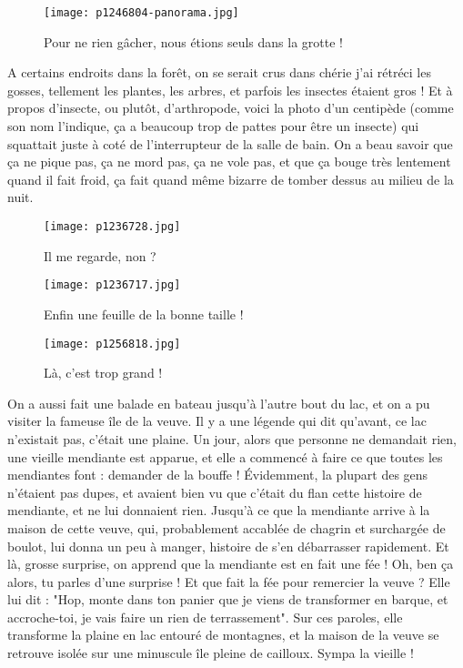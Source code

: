 \documentclass{book}
\begin{document}
\begin{figure}[h]
\centering
\texttt{[image: p1246804-panorama.jpg]}
\caption*{Pour ne rien gâcher, nous étions seuls dans la grotte !}
\end{figure}

A certains endroits dans la forêt, on se serait crus dans chérie j'ai rétréci les gosses, tellement les plantes, les arbres, et parfois les insectes étaient gros ! Et à propos d'insecte, ou plutôt, d'arthropode, voici la photo d'un centipède (comme son nom l'indique, ça a beaucoup trop de pattes pour être un insecte) qui squattait juste à coté de l'interrupteur de la salle de bain. On a beau savoir que ça ne pique pas, ça ne mord pas, ça ne vole pas, et que ça bouge très lentement quand il fait froid, ça fait quand même bizarre de tomber dessus au milieu de la nuit.


\begin{figure}[h]
\centering
\texttt{[image: p1236728.jpg]}
\caption*{Il me regarde, non ?}
\end{figure}


\begin{figure}[h]
\centering
\texttt{[image: p1236717.jpg]}
\caption*{Enfin une feuille de la bonne taille !}
\end{figure}


\begin{figure}[h]
\centering
\texttt{[image: p1256818.jpg]}
\caption*{Là, c'est trop grand !}
\end{figure}

On a aussi fait une balade en bateau jusqu'à l'autre bout du lac, et on a pu visiter la fameuse île de la veuve. Il y a une légende qui dit qu'avant, ce lac n'existait pas, c'était une plaine. Un jour, alors que personne ne demandait rien, une vieille mendiante est apparue, et elle a commencé à faire ce que toutes les mendiantes font : demander de la bouffe ! Évidemment, la plupart des gens n'étaient pas dupes, et avaient bien vu que c'était du flan cette histoire de mendiante, et ne lui donnaient rien. Jusqu'à ce que la mendiante arrive à la maison de cette veuve, qui, probablement accablée de chagrin et surchargée de boulot, lui donna un peu à manger, histoire de s'en débarrasser rapidement. Et là, grosse surprise, on apprend que la mendiante est en fait une fée ! Oh, ben ça alors, tu parles d'une surprise ! Et que fait la fée pour remercier la veuve ? Elle lui dit : "Hop, monte dans ton panier que je viens de transformer en barque, et accroche-toi, je vais faire un rien de terrassement". Sur ces paroles, elle transforme la plaine en lac entouré de montagnes, et la maison de la veuve se retrouve isolée sur une minuscule île pleine de cailloux. Sympa la vieille !
\end{document}
